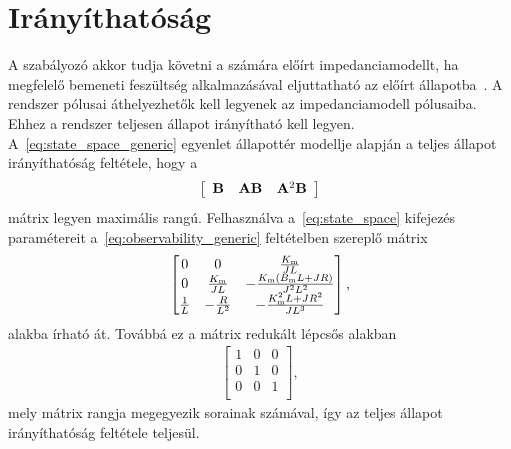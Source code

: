 \section{Irányíthatóság}\label{chap:controllability}
A szabályozó akkor tudja követni a számára előírt impedanciamodellt, 
ha megfelelő bemeneti feszültség alkalmazásával eljuttatható az előírt állapotba~\cite{kalman1963controllability}.
A rendszer pólusai áthelyezhetők kell legyenek az impedanciamodell pólusaiba. Ehhez 
a rendszer teljesen állapot irányítható kell legyen.
A~\eqref{eq:state_space_generic} egyenlet állapottér modellje alapján a teljes állapot irányíthatóság feltétele, hogy a
\begin{align}\label{eq:observability_generic}
    \left[\begin{array}{c|c|c}
        \mathbf{B} & \mathbf{AB} & \mathbf{A}^2 \mathbf{B}
    \end{array}\right]
\end{align}
mátrix legyen maximális rangú. 
Felhasználva a~\eqref{eq:state_space} kifejezés paramétereit a~\eqref{eq:observability_generic} feltételben szereplő mátrix
\begin{align}
    \begin{bmatrix}
        0 & 0 & \frac{K_{\mathrm{m}}}{JL} \\
        0 & \frac{K_{\mathrm{m}}}{JL} & -\frac{K_{\mathrm{m}}\left(B_{\mathrm{m}} L + JR\right)}{J^2 L^2} \\
        \frac{1}{L} & -\frac{R}{L^2} & -\frac{K^2_{\mathrm{m}} L + JR^2}{J L^3} \\
    \end{bmatrix},
\end{align}
alakba írható át. Továbbá ez a mátrix redukált lépcsős alakban
\begin{align}
    \begin{bmatrix}
        1 & 0 & 0 \\
        0 & 1 & 0 \\
        0 & 0 & 1 \\
    \end{bmatrix},
\end{align}
mely mátrix rangja megegyezik sorainak számával, így az teljes állapot irányíthatóság feltétele teljesül.

